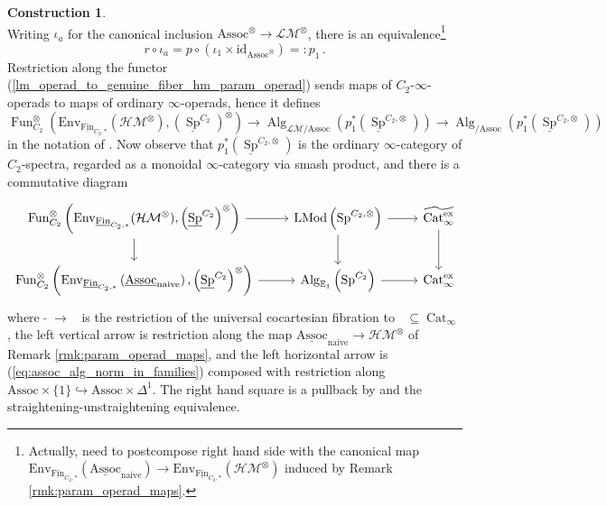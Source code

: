 \documentclass{article}
\DeclareMathOperator{\Alg}{Alg}
\DeclareMathOperator{\Cat}{Cat} %
\DeclareMathOperator{\Catex}{\Cat_\infty^{ex}} %
\DeclareMathOperator{\Fun}{Fun} %
\DeclareMathOperator{\LMod}{LMod} %
\DeclareMathOperator{\Spectra}{Sp} %
\newcommand{\Assoc}{\mathrm{Assoc}}
\newcommand{\Fin}{\mathrm{Fin}} %
\theoremstyle{definition}
\newtheorem{construction}[equation]{Construction}
\begin{document}
\begin{construction}
\begin{equation}
    \end{equation}
    Writing $ \iota_a $ for the canonical inclusion $ \mathrm{Assoc}^\otimes \to \mathcal{LM}^\otimes $, there is an equivalence\footnote{Actually, need to postcompose right hand side with the canonical map $ \mathrm{Env}_{\underline{\Fin}_{C_2,*}}(\underline{\mathrm{Assoc}}_{\mathrm{naive}}) \to \mathrm{Env}_{\underline{\Fin}_{C_2,*}}\left(\mathcal{HM}^\otimes\right) $ induced by Remark \ref{rmk:param_operad_maps}.} 
    \begin{equation}
        r \circ \iota_a = p \circ \left(\iota_{1} \times \mathrm{id}_{\mathrm{Assoc}^\otimes}\right) =:p_1 \,.
    \end{equation}
    Restriction along the functor (\ref{lm_operad_to_genuine_fiber_hm_param_operad}) sends maps of $ C_2 $-$ \infty $-operads to maps of ordinary $ \infty $-operads, hence it defines 
    \begin{equation}
        \Fun^\otimes_{C_2}\left(\mathrm{Env}_{\underline{\Fin}_{C_2,*}}(\mathcal{HM}^\otimes), \left(\underline{\Spectra}^{C_2}\right)^\otimes\right) \to \Alg_{\mathcal{LM}/\mathrm{Assoc}}\left(p_1^*\left(\underline{\Spectra}^{C_2,\otimes}\right)\right) \to \Alg_{/\mathrm{Assoc}}\left(p_1^*\left(\underline{\Spectra}^{C_2,\otimes}\right)\right)
    \end{equation}
    in the notation of \cite[Definition 2.1.3.1]{LurHA}. 
    Now observe that $ p_1^*\left(\underline{\Spectra}^{C_2,\otimes}\right) $ is the ordinary $ \infty $-category of $ C_2 $-spectra, regarded as a monoidal $ \infty $-category via smash product, and there is a commutative diagram
    \begin{equation}
    \begin{tikzcd}
         \Fun^\otimes_{C_2}\left(\mathrm{Env}_{\underline{\Fin}_{C_2,*}}(\mathcal{HM}^\otimes), \left(\underline{\Spectra}^{C_2}\right)^\otimes\right) \ar[r] \ar[d] & \LMod\left(\Spectra^{C_2,\otimes}\right) \ar[r] \ar[d] & \widetilde{\Catex} \ar[d] \\
         \Fun^\otimes_{C_2}\left(\mathrm{Env}_{\underline{\Fin}_{C_2,*}}\left(\underline{\mathrm{Assoc}}_{\mathrm{naive}}\right), \left(\underline{\Spectra}^{C_2}\right)^\otimes\right) \ar[r] &  \Alg_{\mathbb{E}_1}\left(\Spectra^{C_2}\right) \ar[r] & \Catex 
    \end{tikzcd}
    \end{equation}
    where $ \widetilde{\Catex} \to \Catex $ is the restriction of the universal cocartesian fibration to $ \Catex \subseteq \Cat_\infty $, the left vertical arrow is restriction along the map $ \underline{\mathrm{Assoc}}_{\mathrm{naive}} \to \mathcal{HM}^\otimes $ of Remark \ref{rmk:param_operad_maps}, and the left horizontal arrow is (\ref{eq:assoc_alg_norm_in_families}) composed with restriction along $ \Assoc \times \{1\} \hookrightarrow \Assoc \times \Delta^1 $. 
    The right hand square is a pullback by \cite[Corollary 4.2.3.7(3)]{LurHA} and the straightening-unstraightening equivalence.  
\end{construction} 
\end{document}
